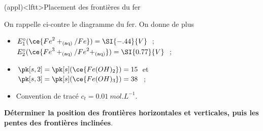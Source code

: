 \documentclass[a4paper, 10pt, landscape, twocolumn]{book}
\begin{document}
\begin{tcb*}[breakable](appl)<lftt>{Placement des frontières du fer}
	\noindent
	\begin{minipage}[c]{.67\linewidth}
		On rappelle ci-contre le diagramme du fer. On donne de plus
		\begin{itemize}
			\item $E_1^\circ(\ce{{Fe}^2+_{\rm(aq)}/Fe}) = \SI{-.44}{V}$~;
			      $E_2^\circ(\ce{{Fe}^3+_{\rm(aq)}/{Fe}^2+_{\rm(aq)}}) = \SI{0.77}{V}$~;
			\item $\pk[s,2] = \pk[s](\ce{Fe(OH)_2}) = 15$ et $\pk[s,3] =
				      \pk[s](\ce{Fe(OH)_3}) = 38$~;
			\item Convention de tracé $c_t = \SI{0.01}{mol.L^{-1}}$.
		\end{itemize}
		\textbf{Déterminer la position des frontières horizontales et verticales,
			puis les pentes des frontières inclinées}.
	\end{minipage}
	\begin{minipage}[c]{.30\linewidth}
		\vspace{0pt}
		\begin{center}
\end{center}
\end{minipage}
\end{tcb*}
\end{document}
